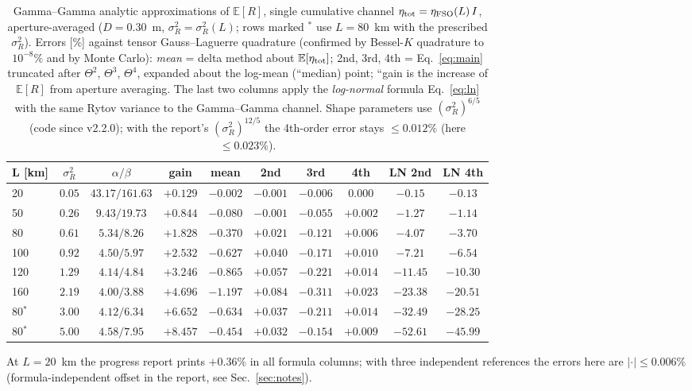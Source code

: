 \begin{table}[htbp]
\centering\scriptsize
\caption{Gamma--Gamma analytic approximations of $\mathbb E[R]$, single cumulative channel $\eta_{\rm tot}=\eta_{\rm FSO}(L)\,I$, aperture-averaged ($D=0.30$~m, $\sigma_R^2=\sigma_R^2(L)$; rows marked $^{*}$ use $L=80$~km with the prescribed $\sigma_R^2$). Errors [\%] against tensor Gauss--Laguerre quadrature (confirmed by Bessel-$K$ quadrature to $10^{-8}\%$ and by Monte Carlo): \emph{mean} = delta method about $\mathbb E[\eta_{\rm tot}]$; 2nd, 3rd, 4th = Eq.~\eqref{eq:main} truncated after $\Theta^2$, $\Theta^3$, $\Theta^4$, expanded about the log-mean (``median) point; ``gain is the increase of $\mathbb E[R]$ from aperture averaging. The last two columns apply the \emph{log-normal} formula Eq.~\eqref{eq:ln} with the same Rytov variance to the Gamma--Gamma channel. Shape parameters use $(\sigma_R^2)^{6/5}$ (code since v2.2.0); with the report's $(\sigma_R^2)^{12/5}$ the 4th-order error stays $\le0.012\%$ (here $\le0.023\%$).}
\label{tab:gg-single}
\begin{tabular}{lccccccccc}
\toprule
L [km] & $\sigma_R^2$ & $\alpha/\beta$ & gain & mean & 2nd & 3rd & 4th & LN 2nd & LN 4th\\
\midrule
20 & $0.05$ & $43.17/161.63$ & $+0.129$ & $-0.002$ & $-0.001$ & $-0.006$ & $0.000$ & $-0.15$ & $-0.13$ \\
50 & $0.26$ & $9.43/19.73$ & $+0.844$ & $-0.080$ & $-0.001$ & $-0.055$ & $+0.002$ & $-1.27$ & $-1.14$ \\
80 & $0.61$ & $5.34/8.26$ & $+1.828$ & $-0.370$ & $+0.021$ & $-0.121$ & $+0.006$ & $-4.07$ & $-3.70$ \\
100 & $0.92$ & $4.50/5.97$ & $+2.532$ & $-0.627$ & $+0.040$ & $-0.171$ & $+0.010$ & $-7.21$ & $-6.54$ \\
120 & $1.29$ & $4.14/4.84$ & $+3.246$ & $-0.865$ & $+0.057$ & $-0.221$ & $+0.014$ & $-11.45$ & $-10.30$ \\
160 & $2.19$ & $4.00/3.88$ & $+4.696$ & $-1.197$ & $+0.084$ & $-0.311$ & $+0.023$ & $-23.38$ & $-20.51$ \\
80$^{*}$ & $3.00$ & $4.12/6.34$ & $+6.652$ & $-0.634$ & $+0.037$ & $-0.211$ & $+0.014$ & $-32.49$ & $-28.25$ \\
80$^{*}$ & $5.00$ & $4.58/7.95$ & $+8.457$ & $-0.454$ & $+0.032$ & $-0.154$ & $+0.009$ & $-52.61$ & $-45.99$ \\

\bottomrule
\end{tabular}
\par\smallskip
\begin{minipage}{0.95\linewidth}\footnotesize At $L=20$~km the progress report prints $+0.36\%$ in all formula columns; with three independent references the errors here are $|\cdot|\le0.006\%$ (formula-independent offset in the report, see Sec.~\ref{sec:notes}).\end{minipage}
\end{table}

